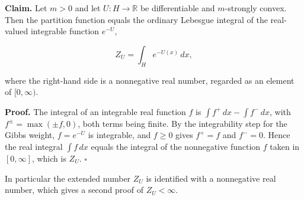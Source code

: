 \documentclass[11pt,a4paper]{article}
\begin{document}
\textbf{Claim.} Let \(m>0\) and let \(U:H\to\mathbb R\) be differentiable and \(m\)-strongly convex. Then the partition function equals the ordinary Lebesgue integral of the real-valued integrable function \(e^{-U}\),


\[Z_U=\int_He^{-U(x)}\,dx,\]


where the right-hand side is a nonnegative real number, regarded as an element of \([0,\infty)\).




\textbf{Proof.} The integral of an integrable real function \(f\) is \(\int f^+\,dx-\int f^-\,dx\), with \(f^\pm=\max(\pm f,0)\), both terms being finite. By the integrability step for the Gibbs weight, \(f=e^{-U}\) is integrable, and \(f\ge0\) gives \(f^+=f\) and \(f^-=0\). Hence the real integral \(\int f\,dx\) equals the integral of the nonnegative function \(f\) taken in \([0,\infty]\), which is \(Z_U\). \(\square\)




In particular the extended number \(Z_U\) is identified with a nonnegative real number, which gives a second proof of \(Z_U<\infty\).
\end{document}
